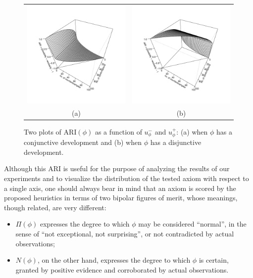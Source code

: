 \documentclass[review]{elsarticle}
\theoremstyle{definition}
\begin{document}
\begin{figure}[t]
  \begin{center}
    \begin{tabular}{cc}
      \includegraphics[width=2.25in]{../ARI-c} &
      \includegraphics[width=2.25in]{../ARI-d} \\
      (a) & (b)
    \end{tabular}
  \end{center}
  \caption{Two plots of $\mathrm{ARI}(\phi)$ as a function of
    $u_\phi^-$ and $u_\phi^+$: (a) when $\phi$ has a conjunctive development and
     (b) when $\phi$ has a disjunctive development.\label{fig:ARI-plots}}
\end{figure}

Although this ARI is useful for the purpose of analyzing the results of our
experiments and to visualize the distribution of the tested axiom with respect
to a single axis, one should always bear in mind that an axiom is scored by
the proposed heuristics in terms of two bipolar figures of merit,
whose meanings, though related, are very different:
\begin{itemize}
\item $\Pi(\phi)$ expresses the degree to which $\phi$ may be considered ``normal'',
  in the sense of ``not exceptional, not surprising'', or not contradicted by
  actual observations;
\item $N(\phi)$, on the other hand, expresses the degree to which $\phi$ is
  certain, granted by positive evidence and corroborated by actual observations.
\end{itemize}
\end{document}
